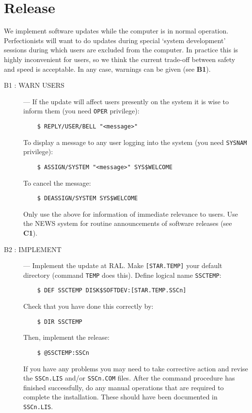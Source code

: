 \section {Release}

We implement software updates while the computer is in normal operation.
Perfectionists will want to do updates during special `system development'
sessions during which users are excluded from the computer.
In practice this is highly inconvenient for users, so we think the current
trade-off between safety and speed is acceptable.
In any case, warnings can be given (see {\bf B1}).

\begin{description}

\item [B1 : WARN USERS] ---
If the update will affect users presently on the system it is wise to inform
them (you need {\tt OPER} privilege):
\begin{verbatim}
    $ REPLY/USER/BELL "<message>"
\end{verbatim}
To display a message to any user logging into the system (you need {\tt SYSNAM}
privilege):
\begin{verbatim}
    $ ASSIGN/SYSTEM "<message>" SYS$WELCOME
\end{verbatim}
To cancel the message:
\begin{verbatim}
    $ DEASSIGN/SYSTEM SYS$WELCOME
\end{verbatim}
Only use the above for information of immediate relevance to users.
Use the NEWS system for routine announcements of software releases (see {\bf
C1}).

\item [B2 : IMPLEMENT] ---
Implement the update at RAL.
Make {\tt [STAR.TEMP]} your default directory (command {\tt TEMP} does this).
Define logical name {\tt SSCTEMP}:
\begin{verbatim}
    $ DEF SSCTEMP DISK$SOFTDEV:[STAR.TEMP.SSCn]
\end{verbatim}
Check that you have done this correctly by:
\begin{verbatim}
    $ DIR SSCTEMP
\end{verbatim}
Then, implement the release:
\begin{verbatim}
    $ @SSCTEMP:SSCn
\end{verbatim}
If you have any problems you may need to take corrective action and revise the
{\tt SSCn.LIS} and/or {\tt SSCn.COM} files.
After the command procedure has finished successfully, do any manual operations
that are required to complete the installation.
These should have been documented in {\tt SSCn.LIS}.


\end{description}
